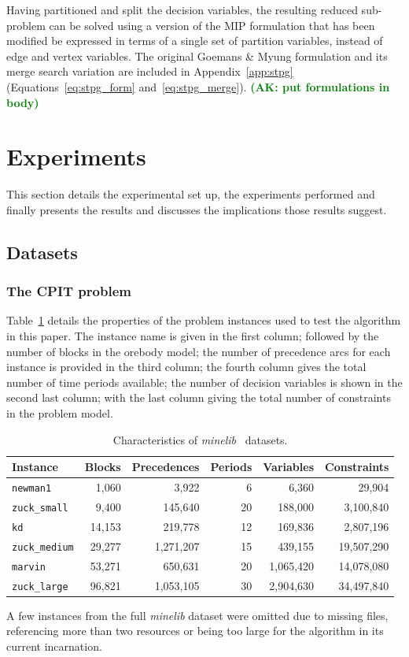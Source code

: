 \documentclass[preprint]{elsarticle}
\newcommand{\ak}[1]{\textbf{\textcolor{green}{(AK: #1)}}}
\begin{document}
Having partitioned and split the decision variables, the resulting reduced sub-problem can be solved using a version of the \citet{goemans} MIP formulation that has been modified be expressed in terms of a single set of partition variables, instead of edge and vertex variables. The original Goemans \& Myung formulation and its merge search variation are included in Appendix~\ref{app:stpg} (Equations~\ref{eq:stpg_form} and~\ref{eq:stpg_merge}).
\ak{put formulations in body}

\section{Experiments}\label{sec:exper}
This section details the experimental set up, the experiments performed and finally presents the results and discusses the implications those results suggest.
\subsection{Datasets}
\subsubsection*{\textbf{The CPIT problem}}
Table~\ref{tab:datasets} details the properties of the problem instances used to test the algorithm in this paper. The instance name is given in the first column; followed by the number of blocks in the orebody model; the number of precedence arcs for each instance is provided in the third column; the fourth column gives the total number of time periods available; the number of decision variables is shown in the second last column; with the last column giving the total number of constraints in the problem model.\par
%
\begin{table}[h!]
\centering
\caption{Characteristics of \emph{minelib}~\citep{minelib} datasets.}\label{tab:datasets}
\begin{tabular}{lrrrrr} \toprule
Instance & Blocks & Precedences & Periods & Variables & Constraints\\
\hline
\texttt{newman1} & 1,060 & 3,922 & 6 & 6,360 & 29,904\\
\texttt{zuck\_small} & 9,400 & 145,640 & 20 & 188,000 & 3,100,840\\
\texttt{kd} & 14,153 & 219,778 & 12 & 169,836 & 2,807,196\\
\texttt{zuck\_medium} & 29,277 & 1,271,207 & 15 & 439,155 & 19,507,290\\
\texttt{marvin} & 53,271 & 650,631 & 20 & 1,065,420 & 14,078,080\\
\texttt{zuck\_large} & 96,821 & 1,053,105 & 30 & 2,904,630 & 34,497,840\\
\bottomrule
\end{tabular}
\end{table}
%
A few instances from the full \emph{minelib} dataset were omitted due to missing files, referencing more than two resources or being too large for the algorithm in its current incarnation.
\end{document}
